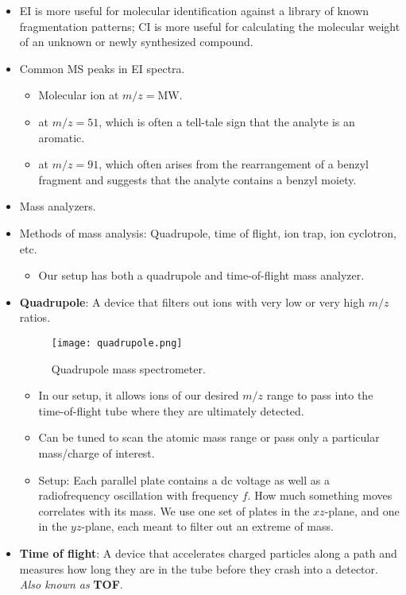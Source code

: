 \documentclass[../notes.tex]{subfiles}
\begin{document}
\begin{itemize}
    \item EI is more useful for molecular identification against a library of known fragmentation patterns; CI is more useful for calculating the molecular weight of an unknown or newly synthesized compound.
    \item Common MS peaks in EI spectra.
    \begin{itemize}
        \item Molecular ion at $m/z=\text{MW}$.
        \item \ce{[C4H3]+} at $m/z=51$, which is often a tell-tale sign that the analyte is an aromatic.
        \item \ce{[C7H7]+} at $m/z=91$, which often arises from the rearrangement of a benzyl fragment and suggests that the analyte contains a benzyl moiety.
    \end{itemize}
    \item Mass analyzers.
    \item Methods of mass analysis: Quadrupole, time of flight, ion trap, ion cyclotron, etc.
    \begin{itemize}
        \item Our setup has both a quadrupole and time-of-flight mass analyzer.
    \end{itemize}
    \item \textbf{Quadrupole}: A device that filters out ions with very low or very high $m/z$ ratios.
    \begin{figure}[H]
        \centering
        \texttt{[image: quadrupole.png]}
        \caption{Quadrupole mass spectrometer.}
        \label{fig:quadrupole}
    \end{figure}
    \begin{itemize}
        \item In our setup, it allows ions of our desired $m/z$ range to pass into the time-of-flight tube where they are ultimately detected.
        \item Can be tuned to scan the atomic mass range or pass only a particular mass/charge of interest.
        \item Setup: Each parallel plate contains a dc voltage as well as a radiofrequency oscillation with frequency $f$. How much something moves correlates with its mass. We use one set of plates in the $xz$-plane, and one in the $yz$-plane, each meant to filter out an extreme of mass.
    \end{itemize}
    \item \textbf{Time of flight}: A device that accelerates charged particles along a path and measures how long they are in the tube before they crash into a detector. \emph{Also known as} \textbf{TOF}.

\end{itemize}
\end{document}
